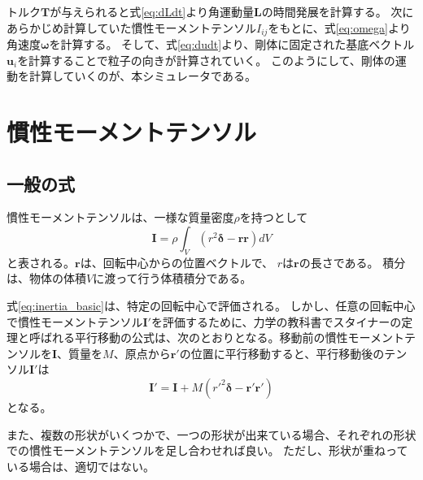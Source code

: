 \documentclass[a4paper,11pt]{jbook}
\begin{document}
トルク$\bm{T}$が与えられると式\eqref{eq:dLdt}より角運動量$\bm{L}$の時間発展を計算する。
次にあらかじめ計算していた慣性モーメントテンソル$I_{ij}$をもとに、式\eqref{eq:omega}より角速度$\bm{\omega}$を計算する。
そして、式\eqref{eq:dudt}より、剛体に固定された基底ベクトル$\bm{u}_i$を計算することで粒子の向きが計算されていく。
このようにして、剛体の運動を計算していくのが、本シミュレータである。
\section{慣性モーメントテンソル}
\subsection{一般の式}
慣性モーメントテンソルは、一様な質量密度$\rho$を持つとして
\begin{equation}
\bm{I}=\rho\int_V\left(r^2\bm{\delta}-\bm{r}\bm{r}\right)dV
\label{eq:inertia_basic}
\end{equation}
と表される。$\bm{r}$は、回転中心からの位置ベクトルで、
$r$は$\bm{r}$の長さである。
積分は、物体の体積$V$に渡って行う体積積分である。

式\eqref{eq:inertia_basic}は、特定の回転中心で評価される。
しかし、任意の回転中心で慣性モーメントテンソル$\bm{I}'$を評価するために、力学の教科書でスタイナーの定理と呼ばれる平行移動の公式は、次のとおりとなる。移動前の慣性モーメントテンソルを$\bm{I}$、質量を$M$、原点から$\bm{r}'$の位置に平行移動すると、平行移動後のテンソル$\bm{I}'$は
\begin{equation}
\bm{I}'=\bm{I}+M\left(r'^2\bm{\delta}-\bm{r}'\bm{r}'\right)
\label{eq:steiner}
\end{equation}
となる。

また、複数の形状がいくつかで、一つの形状が出来ている場合、それぞれの形状での慣性モーメントテンソルを足し合わせれば良い。
ただし、形状が重ねっている場合は、適切ではない。
\end{document}
